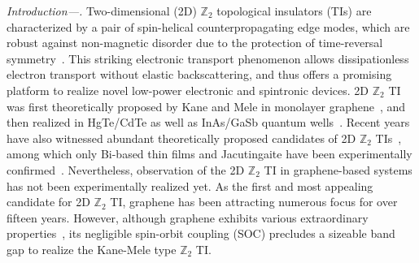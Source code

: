 \documentclass[aps,prl,twocolumn,showpacs,superscriptaddress]{revtex4-1}
\begin{document}
\maketitle
\textit{Introduction---.} Two-dimensional (2D) $\mathbb{Z}_2$ topological insulators (TIs) are characterized by a pair of spin-helical counterpropagating edge modes, which are robust against non-magnetic disorder due to the protection of time-reversal symmetry~\cite{ref1,ref2}. This striking electronic transport phenomenon allows dissipationless electron transport without elastic backscattering, and thus offers a promising platform to realize novel low-power electronic and spintronic devices. 2D $\mathbb{Z}_2$ TI was first theoretically proposed by Kane and Mele in monolayer graphene~\cite{ref4}, and then realized in HgTe/CdTe as well as InAs/GaSb quantum wells~\cite {ref22,ref23,ref5}. Recent years have also witnessed abundant theoretically proposed candidates of 2D $\mathbb{Z}_2$ TIs~\cite {ref55,ref6,ref24,ref25,ref7,ref26,ref27,ref28,ref29,ref30,ref31,ref32,ref33,ref34,ref35,ref36,ref37,ref38,ref39}, among which only Bi-based thin films and Jacutingaite have been experimentally confirmed~\cite {ref44,ref45,ref46,ref47}. Nevertheless, observation of the 2D $\mathbb{Z}_2$ TI in graphene-based systems has not been experimentally realized yet. As the first and most appealing candidate for 2D $\mathbb{Z}_2$ TI, graphene has been attracting numerous focus for over fifteen years. However, although graphene exhibits various extraordinary properties~\cite {ref8}, its negligible spin-orbit coupling (SOC) precludes a sizeable band gap to realize the Kane-Mele type $\mathbb{Z}_2$ TI.
\end{document}
